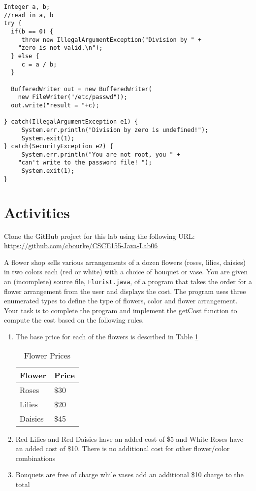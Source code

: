 \documentclass[12pt]{scrartcl}
\begin{document}
\begin{verbatim}
Integer a, b;
//read in a, b
try { 
  if(b == 0) {
     throw new IllegalArgumentException("Division by " +
	"zero is not valid.\n");
  } else {
     c = a / b;
  }

  BufferedWriter out = new BufferedWriter(
	new FileWriter("/etc/passwd"));
  out.write("result = "+c);

} catch(IllegalArgumentException e1) {
     System.err.println("Division by zero is undefined!");
     System.exit(1);
} catch(SecurityException e2) {
     System.err.println("You are not root, you " +
	"can't write to the password file! ");
     System.exit(1);
}
\end{verbatim}

\section{Activities}

Clone the GitHub project for this lab using the following URL:
\url{https://github.com/cbourke/CSCE155-Java-Lab06}

A flower shop sells various arrangements of a dozen flowers 
(roses, lilies, daisies) in two colors each (red or white) with a 
choice of bouquet or vase.  You are given an (incomplete) source 
file, \texttt{Florist.java}, of a program that takes the order 
for a flower arrangement from the user and displays the cost. 
The program uses three enumerated types to define the type 
of flowers, color and flower arrangement.  Your task is to 
complete the program and implement the getCost function to 
compute the cost based on the following rules.
\begin{enumerate}
  \item The base price for each of the flowers is described in Table \ref{table:basePrice}
  \begin{table}[h]
  \centering
  \begin{tabular}{l|l}
  Flower & Price\\
  \hline\hline
  Roses & \$30 \\
  Lilies	 & \$20 \\
  Daisies & \$45 \\
  \end{tabular}
  \caption{Flower Prices}
  \label{table:basePrice}
  \end{table}
  \item Red Lilies and Red Daisies have an added cost of \$5 and White 
  	Roses have an added cost of \$10.  There is no additional cost for 
	other flower/color combinations
  \item Bouquets are free of charge while vases add an additional \$10 charge to the total
\end{enumerate}
	
\end{document}
